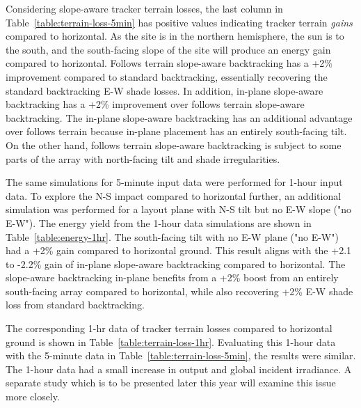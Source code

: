 \documentclass[conference]{IEEEtran}
\begin{document}
Considering slope-aware tracker terrain losses, the last column in Table~\ref{table:terrain-loss-5min} has positive values indicating tracker terrain \textit{gains} compared to horizontal. As the site is in the northern hemisphere, the sun is to the south, and the south-facing slope of the site will produce an energy gain compared to horizontal. Follows terrain slope-aware backtracking has a +2\% improvement compared to standard backtracking, essentially recovering the standard backtracking E-W shade losses. In addition, in-plane slope-aware backtracking has a +2\% improvement over follows terrain slope-aware backtracking. The in-plane slope-aware backtracking has an additional advantage over follows terrain because in-plane placement has an entirely south-facing tilt. On the other hand, follows terrain slope-aware backtracking is subject to some parts of the array with north-facing tilt and shade irregularities. 

The same simulations for 5-minute input data were performed for 1-hour input data. To explore the N-S impact compared to horizontal further, an additional simulation was performed for a layout plane with N-S tilt but no E-W slope ("no E-W"). The energy yield from the 1-hour data simulations are shown in Table~\ref{table:energy-1hr}. The south-facing tilt with no E-W plane ("no E-W") had a +2\% gain compared to horizontal ground. This result aligns with the +2.1 to -2.2\% gain of in-plane slope-aware backtracking compared to horizontal. The slope-aware backtracking in-plane benefits from a +2\% boost from an entirely south-facing array compared to horizontal, while also recovering +2\% E-W shade loss from standard backtracking. 

The corresponding 1-hr data of tracker terrain losses compared to horizontal ground is shown in Table~\ref{table:terrain-loss-1hr}. Evaluating this 1-hour data with the 5-minute data in Table~\ref{table:terrain-loss-5min}, the results were similar. The 1-hour data had a small increase in output and global incident irradiance. A separate study which is to be presented later this year will examine this issue more closely.
\end{document}
